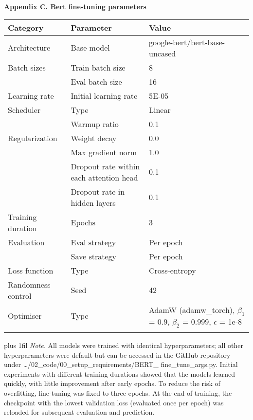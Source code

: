 \documentclass[10pt]{article}
\begin{document}
\noindent\hspace*{1cm}\textbf{\large Appendix C. Bert fine-tuning parameters}

\vspace{1em}

\begin{tabular}{p{3.2cm} p{7.0cm} p{5.6cm}}
\toprule
\textbf{Category} & \textbf{Parameter} & \textbf{Value} \\
\midrule
Architecture & Base model & google-bert/bert-base-uncased \\
\addlinespace[0.9em]
\addlinespace[0.9em]
Batch sizes & Train batch size & 8 \\
 & Eval batch size & 16 \\
\addlinespace[0.9em]
\addlinespace[0.9em]
Learning rate & Initial learning rate & 5E-05 \\
\addlinespace[0.9em]
\addlinespace[0.9em]
Scheduler & Type & Linear \\
 & Warmup ratio & 0.1 \\
\addlinespace[0.9em]
\addlinespace[0.9em]
Regularization & Weight decay & 0.0 \\
 & Max gradient norm & 1.0 \\
 & Dropout rate within each attention head & 0.1 \\
 & Dropout rate in hidden layers & 0.1 \\
\addlinespace[0.9em]
\addlinespace[0.9em]
Training duration & Epochs & 3 \\
\addlinespace[0.9em]
\addlinespace[0.9em]
Evaluation & Eval strategy & Per epoch \\
 & Save strategy & Per epoch \\
\addlinespace[0.9em]
\addlinespace[0.9em]
Loss function & Type & Cross-entropy \\
\addlinespace[0.9em]
\addlinespace[0.9em]
Randomness control & Seed & 42 \\
\addlinespace[0.9em]
\addlinespace[0.9em]
Optimiser & Type & AdamW (adamw\_torch), $\beta_1$ = 0.9, $\beta_2$ = 0.999, $\epsilon$ = 1e-8 \\
\addlinespace[0.9em]
\addlinespace[0.9em]
\bottomrule
\end{tabular}

\vspace{0.9em}

\noindent\hspace*{0.5cm}\begin{minipage}{15.8cm}
\fontsize{10}{12}\selectfont
\leftskip=0pt \rightskip=0pt plus 1fil \parfillskip=0pt
\textit{Note.} All models were trained with identical hyperparameters; all other hyperparameters were default but can be accessed in the GitHub repository under …/02\_code/00\_setup\_requirements/BERT\_ fine\_tune\_args.py. Initial experiments with different training durations showed that the models learned quickly, with little improvement after early epochs. To reduce the risk of overfitting, fine-tuning was fixed to three epochs. At the end of training, the checkpoint with the lowest validation loss (evaluated once per epoch) was reloaded for subsequent evaluation and prediction.
\end{minipage}
\end{document}
